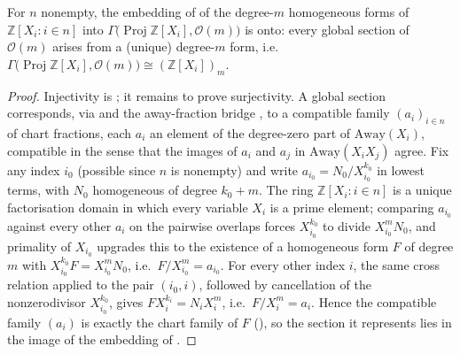 \begin{lemma}\leanok
  \label{lem:serre_twist_sections}
  For \(n\) nonempty, the embedding of  of
  the degree-\(m\) homogeneous forms of \(\mathbb Z[X_i : i \in n]\) into
  \(\Gamma\bigl(\operatorname{Proj}\mathbb Z[X_i], \mathcal O(m)\bigr)\) is
  onto: every global section of \(\mathcal O(m)\) arises from a (unique)
  degree-\(m\) form, i.e.
  \(\Gamma\bigl(\operatorname{Proj}\mathbb Z[X_i], \mathcal O(m)\bigr)
  \cong (\mathbb Z[X_i])_m\).
\end{lemma}
\begin{proof}\leanok
  Injectivity is ; it remains to prove
  surjectivity. A global section corresponds, via
   and the away-fraction bridge
  , to a compatible family
  \((a_i)_{i \in n}\) of chart fractions, each \(a_i\) an element of the
  degree-zero part of \(\mathrm{Away}(X_i)\), compatible in the sense
  that the images of \(a_i\) and \(a_j\) in \(\mathrm{Away}(X_i X_j)\)
  agree. Fix any index \(i_0\) (possible since \(n\) is nonempty) and
  write \(a_{i_0} = N_0/X_{i_0}^{k_0}\) in lowest terms, with \(N_0\)
  homogeneous of degree \(k_0 + m\). The ring \(\mathbb Z[X_i : i \in n]\)
  is a unique factorisation domain in which every variable \(X_i\) is a
  prime element; comparing \(a_{i_0}\) against every other \(a_i\) on the
  pairwise overlaps forces \(X_{i_0}^{k_0}\) to divide \(X_{i_0}^m N_0\),
  and primality of \(X_{i_0}\) upgrades this to the existence of a
  homogeneous form \(F\) of degree \(m\) with
  \(X_{i_0}^{k_0} F = X_{i_0}^m N_0\), i.e.\ \(F/X_{i_0}^m = a_{i_0}\).
  For every other index \(i\), the same cross relation applied to the
  pair \((i_0, i)\), followed by cancellation of the nonzerodivisor
  \(X_{i_0}^{k_0}\), gives \(F X_i^{k_i} = N_i X_i^m\), i.e.\
  \(F/X_i^m = a_i\). Hence the compatible family \((a_i)\) is exactly the
  chart family of \(F\) (\Cref{lem:serre_twist_form_compatible}), so the
  section it represents lies in the image of the embedding of
  .
\end{proof}

